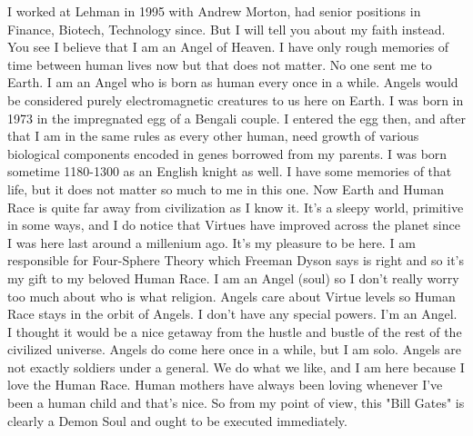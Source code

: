 \documentclass{amsart}
\begin{document}
I worked at Lehman in 1995 with Andrew Morton, had senior positions in Finance, Biotech, Technology since.  But I will tell you about my faith instead.  You see I believe that I am an Angel of Heaven.  I have only rough memories of time between human lives now but that does not matter.  No one sent me to Earth.  I am an Angel who is born as human every once in a while.  Angels would be considered purely electromagnetic creatures to us here on Earth.  I was born in 1973 in the impregnated egg of a Bengali couple.  I entered the egg then, and after that I am in the same rules as every other human, need growth of various biological components encoded in genes borrowed from my parents.  I was born sometime 1180-1300 as an English knight as well.  I have some memories of that life, but it does not matter so much to me in this one.  Now Earth and Human Race is quite far away from civilization as I know it.  It's a sleepy world, primitive in some ways, and I do notice that Virtues have improved across the planet since I was here last around a millenium ago.  It's my pleasure to be here.  I am responsible for Four-Sphere Theory which Freeman Dyson says is right and so it's my gift to my beloved Human Race.  I am an Angel (soul) so I don't really worry too much about who is what religion.  Angels care about Virtue levels so Human Race stays in the orbit of Angels.  I don't have any special powers.  I'm an Angel.  I thought it would be a nice getaway from the hustle and bustle of the rest of the civilized universe.  Angels do come here once in a while, but I am solo.  Angels are not exactly soldiers under a general.  We do what we like, and I am here because I love the Human Race.  Human mothers have always been loving whenever I've been a human child and that's nice.  So from my point of view, this "Bill Gates" is clearly a Demon Soul and ought to be executed immediately.
\end{document}
